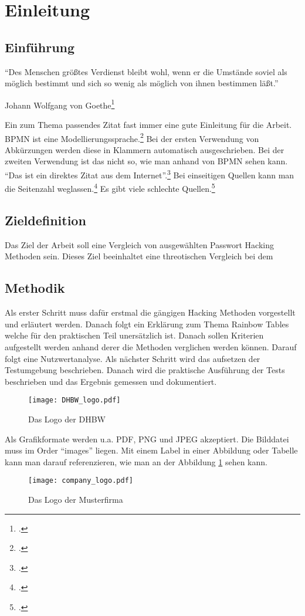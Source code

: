 \section{Einleitung}
\subsection{Einführung}
\epigraph{"`Des Menschen größtes Verdienst bleibt wohl, wenn er die Umstände soviel als möglich bestimmt und sich so wenig als möglich von ihnen bestimmen läßt."'}{Johann Wolfgang von Goethe\footcite[S. 10]{Freund2014}}
Ein zum Thema passendes Zitat fast immer eine gute Einleitung für die Arbeit. 
\ac{BPMN} ist eine Modellierungssprache.\footcite[Vgl.][S. 1]{Freund2014} Bei der ersten Verwendung von Abkürzungen werden diese in Klammern automatisch ausgeschrieben. 
Bei der zweiten Verwendung ist das nicht so, wie man anhand von \ac{BPMN} sehen kann. "`Das ist ein direktes Zitat aus dem Internet"'.\footcite[S. 3]{OMG2018}
Bei einseitigen Quellen kann man die Seitenzahl weglassen.\footcite[Vgl.][]{schlechteQuelle}
Es gibt viele schlechte Quellen.\footcite[Vgl.][S. 1-3]{schlechteQuelle2}

\subsection{Zieldefinition}
Das Ziel der Arbeit soll eine Vergleich von ausgewählten Passwort Hacking Methoden sein. 
Dieses Ziel beeinhaltet eine threotischen Vergleich bei dem 
\subsection{Methodik}
Als erster Schritt muss dafür erstmal die gängigen Hacking Methoden vorgestellt und erläutert werden. 
Danach folgt ein Erklärung zum Thema Rainbow Tables welche für den praktischen Teil unersätzlich ist.
Danach sollen Kriterien aufgestellt werden anhand derer die Methoden verglichen werden können. 
Darauf folgt eine Nutzwertanalyse. 
Als nächster Schritt wird das aufsetzen der Testumgebung beschrieben.
Danach wird die praktische Ausführung der Tests beschrieben und das Ergebnis gemessen und dokumentiert.


\begin{figure}[H]
  \centering
	\texttt{[image: DHBW\_logo.pdf]}
   \caption[Das Logo der DHBW]{Das Logo der DHBW\footnotemark}
\end{figure}

Als Grafikformate werden u.a. PDF, PNG und JPEG akzeptiert. Die Bilddatei muss im Order "`images"' liegen.
Mit einem Label in einer Abbildung oder Tabelle kann man darauf referenzieren, wie man an der Abbildung \ref{AbbildungLogoMusterfirma} sehen kann.
\begin{figure}[H]
  \centering
	\texttt{[image: company\_logo.pdf]}
   \caption[Das Logo der Musterfirma]{Das Logo der Musterfirma\protect\footnotemark}
   \label{AbbildungLogoMusterfirma}
\end{figure}

